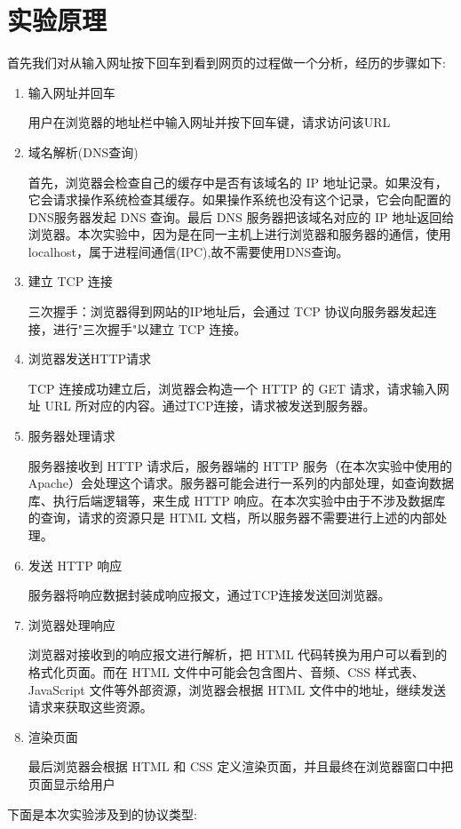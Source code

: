 \documentclass[UTF8,a4paper,10pt]{ctexart}
\begin{document}
\vspace{1cm}
\section{实验原理}
首先我们对从输入网址按下回车到看到网页的过程做一个分析，经历的步骤如下:
\vspace{1cm}
\begin{enumerate}
\item  输入网址并回车\par
用户在浏览器的地址栏中输入网址并按下回车键，请求访问该URL
\item 域名解析(DNS查询)\par
首先，浏览器会检查自己的缓存中是否有该域名的 IP 地址记录。如果没有，它会请求操作系统检查其缓存。如果操作系统也没有这个记录，它会向配置的DNS服务器发起 DNS 查询。最后 DNS 服务器把该域名对应的 IP 地址返回给浏览器。本次实验中，因为是在同一主机上进行浏览器和服务器的通信，使用 localhost，属于进程间通信(IPC),故不需要使用DNS查询。
\item 建立 TCP 连接\par
三次握手：浏览器得到网站的IP地址后，会通过 TCP 协议向服务器发起连接，进行"三次握手"以建立 TCP 连接。
\item 浏览器发送HTTP请求\par
TCP 连接成功建立后，浏览器会构造一个 HTTP 的 GET 请求，请求输入网址 URL 所对应的内容。通过TCP连接，请求被发送到服务器。
\item 服务器处理请求\par
服务器接收到 HTTP 请求后，服务器端的 HTTP 服务（在本次实验中使用的 Apache）会处理这个请求。服务器可能会进行一系列的内部处理，如查询数据库、执行后端逻辑等，来生成 HTTP 响应。在本次实验中由于不涉及数据库的查询，请求的资源只是 HTML 文档，所以服务器不需要进行上述的内部处理。
\item 发送 HTTP 响应\par
服务器将响应数据封装成响应报文，通过TCP连接发送回浏览器。
\item 浏览器处理响应\par
浏览器对接收到的响应报文进行解析，把 HTML 代码转换为用户可以看到的格式化页面。而在 HTML 文件中可能会包含图片、音频、CSS 样式表、JavaScript 文件等外部资源，浏览器会根据 HTML 文件中的地址，继续发送请求来获取这些资源。
\item 渲染页面\par
最后浏览器会根据 HTML 和 CSS 定义渲染页面，并且最终在浏览器窗口中把页面显示给用户
\end{enumerate}

\vspace{1cm}
下面是本次实验涉及到的协议类型:
\end{document}
